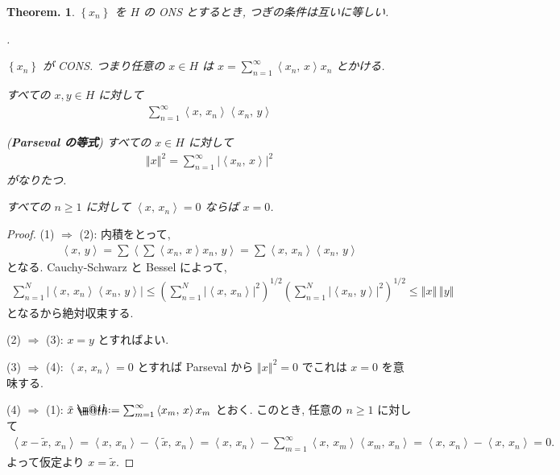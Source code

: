 \documentclass[openany, a4paper, oneside]{jsbook}
\makeatletter
\newcounter{enum2}
\renewenvironment{enumerate}{%
\begin{list}%
{%
\arabic{enum2}.\ \,%
}%
{%
\usecounter{enum2}
\setlength{\itemindent}{0pt}%
\setlength{\leftmargin}{15pt}%
\setlength{\rightmargin}{0pt}%
\setlength{\labelsep}{0pt}%
\setlength{\labelwidth}{6pt}%
\setlength{\itemsep}{0pt}%
\setlength{\parsep}{0pt}%
\setlength{\listparindent}{0pt}%
}
}{%
\end{list}%
}
\newcommand*{\defeq}{\mathrel{\rlap{%
\raisebox{0.3ex}{$\m@th\cdot$}}%
\raisebox{-0.3ex}{$\m@th\cdot$}}%
=}
\theoremstyle{break}
\newtheorem{thm}{Theorem.}[section]
\theoremstyle{breakdefn}
\newcommand{\abs}[1]{\left|#1\right|}
\newcommand{\norm}[1]{\left\Vert#1\right\Vert}
\newcommand{\rbk}[1]{\left (#1\right)}
\newcommand{\cbk}[1]{\left\{#1\right\}}
\newcommand{\bkt}[2]{\left\langle#1,\,#2\right\rangle}
\newcommand{\upbf}[1]{\textup{\textbf{#1}}}
\makeatother
\begin{document}
\begin{thm}\label{functional_analysis_hilbert_space_yukimi_8}
 $\cbk{x_n}$ を $H$ の ONS とするとき, つぎの条件は互いに等しい.
\begin{enumerate}
\item $\cbk{x_n}$ が CONS.
    つまり任意の $x \in H$ は $x = \sum_{n=1}^\infty \bkt{x_n}{x} x_n$ とかける.
\item すべての $x, y \in H$ に対して
   \begin{align}
    \sum_{n=1}^\infty \bkt{x}{x_n} \bkt{x_n}{y} \label{functional_analysis_hilbert_space_yukimi_9}
   \end{align}
\item (\upbf{Parseval の等式}) すべての $x \in H$ に対して
   \begin{align}
    \norm{x}^2
    =
    \sum_{n = 1}^\infty \abs{\bkt{x_n}{x}}^2
   \end{align}
    がなりたつ.
\item すべての $n \geq 1$ に対して $\bkt{x}{x_n} = 0$ ならば $x = 0$.
\end{enumerate}
\end{thm}
\begin{proof}
(1) $\Rightarrow$ (2):
内積をとって,
\begin{align}
 \bkt{x}{y}
 =
 \sum \bkt{\sum \bkt{x_n}{x} x_n}{y}
 =
 \sum \bkt{x}{x_n} \bkt{x_n}{y}
\end{align}
となる.
Cauchy-Schwarz と Bessel によって,
\begin{align}
 \sum_{n=1}^N \abs{\bkt{x}{x_n} \bkt{x_n}{y}}
 \leq
 \rbk{\sum_{n=1}^N \abs{\bkt{x}{x_n}}^2}^{1/2}
  \rbk{\sum_{n=1}^N \abs{\bkt{x_n}{y}}^2}^{1/2}
 \leq
 \norm{x} \, \norm{y}
\end{align}
となるから絶対収束する.

(2) $\Rightarrow$ (3):
$x = y$ とすればよい.

(3) $\Rightarrow$ (4):
$\bkt{x}{x_n} = 0$ とすれば Parseval から $\norm{x}^2 = 0$ でこれは $x = 0$ を意味する.

(4) $\Rightarrow$ (1):
$\tilde{x} \defeq \sum_{m = 1}^\infty \bkt{x_m}{x} x_m$ とおく.
このとき, 任意の $n \geq 1$ に対して
\begin{align}
 \bkt{x - \tilde{x}}{x_n}
 =
 \bkt{x}{x_n} - \bkt{\tilde{x}}{x_n}
 =
 \bkt{x}{x_n} - \sum_{m=1}^{\infty} \bkt{x}{x_m} \bkt{x_m}{x_n}
 =
 \bkt{x}{x_n} - \bkt{x}{x_n}
 = 0.
\end{align}
よって仮定より $x = \tilde{x}$.
\end{proof}
\end{document}
